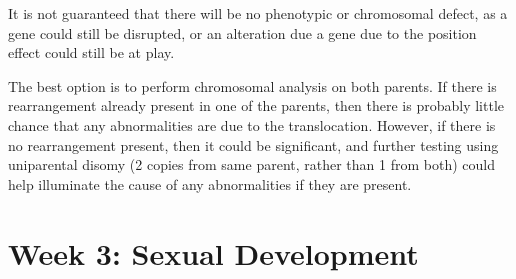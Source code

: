 \documentclass[basic]{inVerba-notes}
\begin{document}
\begin{enumerate}
    It is not guaranteed that there will be no phenotypic or chromosomal defect, as a gene could still be disrupted, or an alteration due a gene due to the position effect could still be at play. 

    The best option is to perform chromosomal analysis on both parents. If there is rearrangement already present in one of the parents, then there is probably little chance that any abnormalities are due to the translocation. However, if there is no rearrangement present, then it could be significant, and further testing using uniparental disomy (2 copies from same parent, rather than 1 from both) could help illuminate the cause of any abnormalities if they are present.
  \end{enumerate}

  \section{Week 3: Sexual Development}
\end{document}
